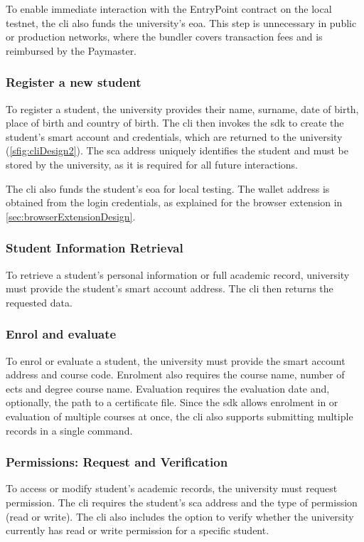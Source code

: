 To enable immediate interaction with the EntryPoint contract on the local testnet, the \acrshort{cli} also funds the university's \acrshort{eoa}. This step is unnecessary in public or production networks, where the bundler covers transaction fees and is reimbursed by the Paymaster.

\subsubsection{Register a new student}
To register a student, the  university provides their name, surname, date of birth, place of birth and country of birth. The \acrshort{cli} then invokes the \acrshort{sdk} to create the student's smart account and credentials, which are returned to the university (\cref{sfig:cliDesign2}). The \acrshort{sca} address uniquely identifies the student and must be stored by the university, as it is required for all future interactions. 

The \acrshort{cli} also funds the student's \acrshort{eoa} for local testing. The wallet address is obtained from the login credentials, as explained for the browser extension in \cref{sec:browserExtensionDesign}.

\subsubsection{Student Information Retrieval}
To retrieve a student's personal information or full academic record, university must provide the student's smart account address. The \acrshort{cli} then returns the requested data.

\subsubsection{Enrol and evaluate}
To enrol or evaluate a student, the university must provide the smart account address and course code. Enrolment also requires the course name, number of \acrshort{ects} and degree course name. Evaluation requires the evaluation date and, optionally, the path to a certificate file. Since the \acrshort{sdk} allows enrolment in or evaluation of multiple courses at once, the \acrshort{cli} also supports submitting multiple records in a single command.     

\subsubsection{Permissions: Request and Verification}
To access or modify student's academic records, the university must request permission. The \acrshort{cli} requires the student's \acrshort{sca} address and the type of permission (read or write).
The \acrshort{cli} also includes the option to verify whether the university currently has read or write permission for a specific student.

